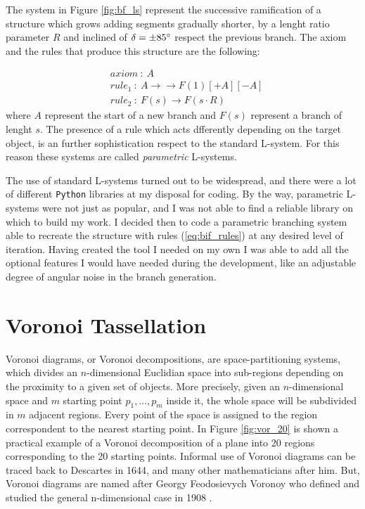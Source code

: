 \documentclass[12pt,a4paper]{report}
\providecommand{\DIFdelbegin}{} %
\providecommand{\DIFdelend}{} %
\newcommand{\DIFscaledelfig}{0.5}
\newlength{\DIFdelgraphicswidth} %
\newlength{\DIFdelgraphicsheight} %
\newcommand{\DIFdelincludegraphics}[2][]{%
\sbox{\DIFdelgraphicsbox}{\DIFOincludegraphics[#1]{#2}}%
\settoboxwidth{\DIFdelgraphicswidth}{\DIFdelgraphicsbox} %
\settoboxtotalheight{\DIFdelgraphicsheight}{\DIFdelgraphicsbox} %
\scalebox{\DIFscaledelfig}{%
\parbox[b]{\DIFdelgraphicswidth}{\usebox{\DIFdelgraphicsbox}\\[-\baselineskip] \rule{\DIFdelgraphicswidth}{0em}}\llap{\resizebox{\DIFdelgraphicswidth}{\DIFdelgraphicsheight}{%
\setlength{\unitlength}{\DIFdelgraphicswidth}%
\begin{picture}(1,1)%
\thicklines\linethickness{2pt} %
{\color[rgb]{1,0,0}\put(0,0){\framebox(1,1){}}}%
{\color[rgb]{1,0,0}\put(0,0){\line( 1,1){1}}}%
{\color[rgb]{1,0,0}\put(0,1){\line(1,-1){1}}}%
\end{picture}%
}\hspace*{3pt}}} %
} %
\DeclareRobustCommand{\DIFdelbegin}{\DIFOdelbegin \let\includegraphics\DIFdelincludegraphics} %
\DeclareRobustCommand{\DIFdelend}{\DIFOaddend \let\includegraphics\DIFOincludegraphics} %
\begin{document}
\DIFdelbegin %

\DIFdelend The system in Figure \ref{fig:bf_ls} represent the successive ramification of a structure which grows adding segments gradually shorter, by a lenght ratio parameter $R$ and inclined of $\delta = \pm 85 \degree$ respect the previous branch. The axiom and the rules that produce this structure are the following:

    \begin{align}
        & axiom\ :\ A \label{eq:bif_rules} \\
        & rule_1\ :\ A \rightarrow → F(1)[+A][-A] \nonumber \\
        & rule_2\ :\ F(s) \rightarrow F(s\cdot R) \nonumber
    \end{align}
    where $A$ represent the start of a new branch  and $F(s)$ represent a branch of lenght $s$. The presence of a rule which acts dfferently depending on the target object, is an further sophistication respect to the standard L-system. For this reason these systems are called \textit{parametric} L-systems.

    The use of standard L-systems turned out to be widespread, and there were a lot of different \texttt{Python} libraries at my disposal for coding. By the way, parametric L-systems were not just as popular, and I was not able to find a reliable library on which to build my work. I decided then to code a parametric branching system able to recreate the structure with rules (\ref{eq:bif_rules}) at any desired level of iteration. Having created the tool I needed on my own I was able to add all the optional features I would have needed during the development, like an adjustable degree of angular noise in the branch generation.

\section{Voronoi Tassellation} \label{ssec:vor_tass}
    Voronoi diagrams, or Voronoi decompositions, are space-partitioning systems, which divides an $n$-dimensional Euclidian space into sub-regions depending on the proximity to a given set of objects. More precisely, given an $n$-dimensional space and $m$ starting point $p_1,\dots, p_m$ inside it, the whole space will be subdivided in $m$ adjacent regions. Every point of the space is assigned to the region correspondent to the nearest starting point. In Figure \ref{fig:vor_20} is shown a practical example of a Voronoi decomposition of a plane into 20 regions corresponding to the 20 starting points. Informal use of Voronoi diagrams can be traced back to Descartes in 1644, and many other mathematicians after him. But, Voronoi diagrams are named after Georgy Feodosievych Voronoy who defined and studied the general n-dimensional case in 1908 \cite{VoronoiNouvellesAD}.
\end{document}
